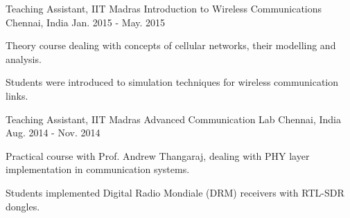 \begin{cventries}
	\cventry
	{Teaching Assistant, IIT Madras}
	{Introduction to Wireless Communications}
	{Chennai, India}
	{Jan. 2015 - May. 2015}
	{
		\begin{cvitems}
		\item{Theory course dealing with concepts of cellular networks, their modelling and analysis.}
		\item{Students were introduced to simulation techniques for wireless communication links.}
		\end{cvitems}
	}

	\cventry
	{Teaching Assistant, IIT Madras}
	{Advanced Communication Lab}
	{Chennai, India}
	{Aug. 2014 - Nov. 2014}
	{
		\begin{cvitems}
		\item{Practical course with Prof. Andrew Thangaraj, dealing with PHY layer implementation in communication systems.}
		\item{Students implemented Digital Radio Mondiale (DRM) receivers with RTL-SDR dongles.}
		\end{cvitems}
	}

\end{cventries}
